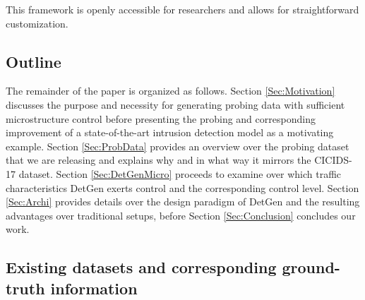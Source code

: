 \documentclass[runningheads]{llncs}
\begin{document}
%
%
%


This framework is openly accessible for researchers and allows for straightforward customization.


\subsection{Outline}

The remainder of the paper is organized as follows. Section \ref{Sec:Motivation} discusses the purpose and necessity for generating probing data with sufficient microstructure control before presenting the probing and corresponding improvement of a state-of-the-art intrusion detection model as a motivating example. Section \ref{Sec:ProbData} provides an overview over the probing dataset that we are releasing and explains why and in what way it mirrors the CICIDS-17 dataset. Section \ref{Sec:DetGenMicro} proceeds to examine over which traffic characteristics DetGen exerts control and the corresponding control level.
Section \ref{Sec:Archi} provides details over the design paradigm of DetGen and the resulting advantages over traditional setups, before Section \ref{Sec:Conclusion} concludes our work.

\subsection{Existing datasets and corresponding ground-truth information}
\end{document}
